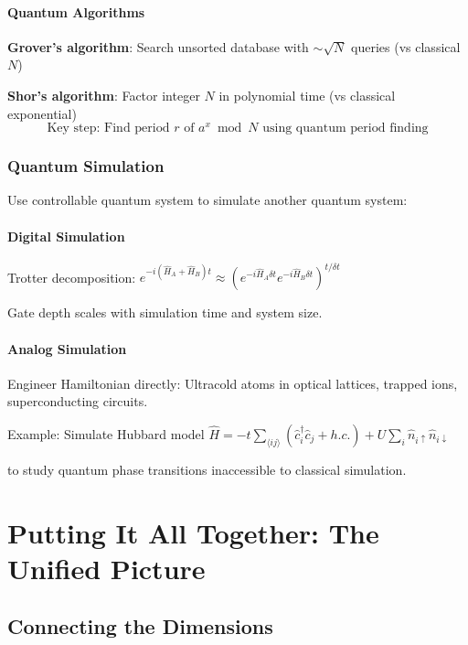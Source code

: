 \documentclass[12pt,openany,oneside]{book}
\begin{document}
{{{{\subsection{Quantum Algorithms}

\textbf{Grover's algorithm}: Search unsorted database with $\sim\sqrt{N}$ queries (vs classical $N$)

\textbf{Shor's algorithm}: Factor integer $N$ in polynomial time (vs classical exponential)
\[
\text{Key step: Find period } r \text{ of } a^x \bmod N \text{ using quantum period finding}
\]

\section{Quantum Simulation}

Use controllable quantum system to simulate another quantum system:

\subsection{Digital Simulation}

Trotter decomposition: $e^{-i(\hat{H}_A + \hat{H}_B)t} \approx (e^{-i\hat{H}_A\delta t}e^{-i\hat{H}_B\delta t})^{t/\delta t}$

Gate depth scales with simulation time and system size.

\subsection{Analog Simulation}

Engineer Hamiltonian directly: Ultracold atoms in optical lattices, trapped ions, superconducting circuits.

Example: Simulate Hubbard model $\hat{H} = -t\sum_{\langle ij \rangle}(\hat{c}_i^\dagger\hat{c}_j + h.c.) + U\sum_i\hat{n}_{i\uparrow}\hat{n}_{i\downarrow}$

to study quantum phase transitions inaccessible to classical simulation.

\part{Putting It All Together: The Unified Picture}

\chapter{Connecting the Dimensions}

}}}}
\end{document}
